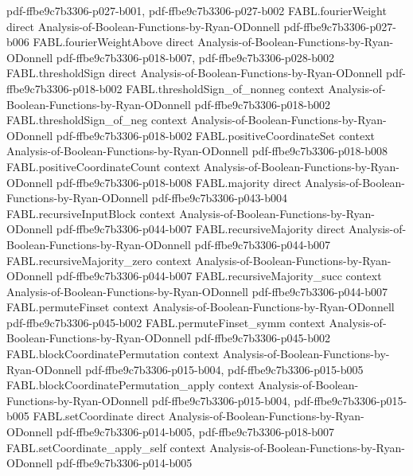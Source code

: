 \begin{theorem}
  {pdf-ffbe9c7b3306-p027-b001,
    pdf-ffbe9c7b3306-p027-b002}
\proofstep
  {FABL.fourierWeight}
  {direct}
  {Analysis-of-Boolean-Functions-by-Ryan-ODonnell}
  {pdf-ffbe9c7b3306-p027-b006}
\proofstep
  {FABL.fourierWeightAbove}
  {direct}
  {Analysis-of-Boolean-Functions-by-Ryan-ODonnell}
  {pdf-ffbe9c7b3306-p018-b007,
    pdf-ffbe9c7b3306-p028-b002}
\proofstep
  {FABL.thresholdSign}
  {direct}
  {Analysis-of-Boolean-Functions-by-Ryan-ODonnell}
  {pdf-ffbe9c7b3306-p018-b002}
\proofstep
  {FABL.thresholdSign_of_nonneg}
  {context}
  {Analysis-of-Boolean-Functions-by-Ryan-ODonnell}
  {pdf-ffbe9c7b3306-p018-b002}
\proofstep
  {FABL.thresholdSign_of_neg}
  {context}
  {Analysis-of-Boolean-Functions-by-Ryan-ODonnell}
  {pdf-ffbe9c7b3306-p018-b002}
\proofstep
  {FABL.positiveCoordinateSet}
  {context}
  {Analysis-of-Boolean-Functions-by-Ryan-ODonnell}
  {pdf-ffbe9c7b3306-p018-b008}
\proofstep
  {FABL.positiveCoordinateCount}
  {context}
  {Analysis-of-Boolean-Functions-by-Ryan-ODonnell}
  {pdf-ffbe9c7b3306-p018-b008}
\proofstep
  {FABL.majority}
  {direct}
  {Analysis-of-Boolean-Functions-by-Ryan-ODonnell}
  {pdf-ffbe9c7b3306-p043-b004}
\proofstep
  {FABL.recursiveInputBlock}
  {context}
  {Analysis-of-Boolean-Functions-by-Ryan-ODonnell}
  {pdf-ffbe9c7b3306-p044-b007}
\proofstep
  {FABL.recursiveMajority}
  {direct}
  {Analysis-of-Boolean-Functions-by-Ryan-ODonnell}
  {pdf-ffbe9c7b3306-p044-b007}
\proofstep
  {FABL.recursiveMajority_zero}
  {context}
  {Analysis-of-Boolean-Functions-by-Ryan-ODonnell}
  {pdf-ffbe9c7b3306-p044-b007}
\proofstep
  {FABL.recursiveMajority_succ}
  {context}
  {Analysis-of-Boolean-Functions-by-Ryan-ODonnell}
  {pdf-ffbe9c7b3306-p044-b007}
\proofstep
  {FABL.permuteFinset}
  {context}
  {Analysis-of-Boolean-Functions-by-Ryan-ODonnell}
  {pdf-ffbe9c7b3306-p045-b002}
\proofstep
  {FABL.permuteFinset_symm}
  {context}
  {Analysis-of-Boolean-Functions-by-Ryan-ODonnell}
  {pdf-ffbe9c7b3306-p045-b002}
\proofstep
  {FABL.blockCoordinatePermutation}
  {context}
  {Analysis-of-Boolean-Functions-by-Ryan-ODonnell}
  {pdf-ffbe9c7b3306-p015-b004,
    pdf-ffbe9c7b3306-p015-b005}
\proofstep
  {FABL.blockCoordinatePermutation_apply}
  {context}
  {Analysis-of-Boolean-Functions-by-Ryan-ODonnell}
  {pdf-ffbe9c7b3306-p015-b004,
    pdf-ffbe9c7b3306-p015-b005}
\proofstep
  {FABL.setCoordinate}
  {direct}
  {Analysis-of-Boolean-Functions-by-Ryan-ODonnell}
  {pdf-ffbe9c7b3306-p014-b005,
    pdf-ffbe9c7b3306-p018-b007}
\proofstep
  {FABL.setCoordinate_apply_self}
  {context}
  {Analysis-of-Boolean-Functions-by-Ryan-ODonnell}
  {pdf-ffbe9c7b3306-p014-b005}

\end{theorem}

